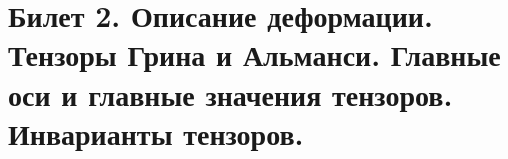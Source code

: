 \newpage
\section{Билет 2. Описание деформации. Тензоры Грина и Альманси. Главные оси и главные значения тензоров. Инварианты тензоров.}